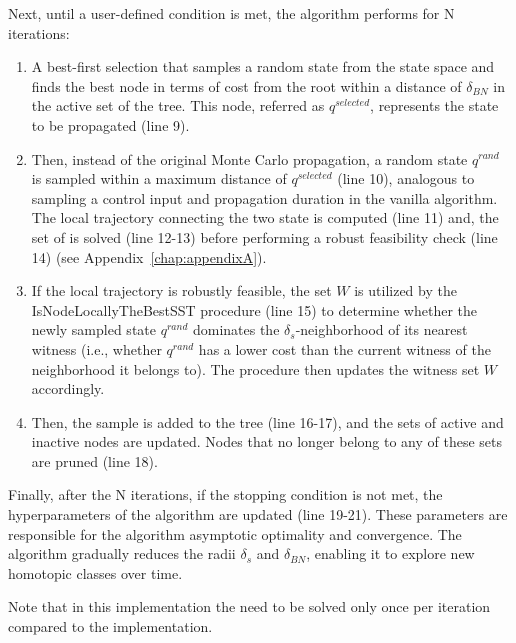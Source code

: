 Next, until a user-defined condition is met, the algorithm performs for N iterations:
\begin{enumerate}
    \item A best-first selection that samples a random state from the state space and finds the best node in terms of cost from the root within a distance of $\delta_{BN}$ in the active set of the tree. 
    This node, referred as $q^{selected}$, represents the state to be propagated (line 9).
    \item Then, instead of the original Monte Carlo propagation, a random state $q^{rand}$ is sampled within a maximum distance of $q^{selected}$ (line 10), analogous to sampling a control input and propagation duration in the vanilla algorithm.
    The local trajectory connecting the two state is computed (line 11) and, the set of  is solved (line 12-13) before performing a robust feasibility check (line 14) (see Appendix~\ref{chap:appendixA}).
    \item If the local trajectory is robustly feasible, the set $W$ is utilized by the IsNodeLocallyTheBestSST procedure (line 15) to determine whether the newly sampled state $q^{rand}$ dominates the $\delta_s$-neighborhood of its nearest witness (i.e., whether $q^{rand}$ has a lower cost than the current witness of the neighborhood it belongs to). 
    The procedure then updates the witness set $W$ accordingly.
    \item Then, the sample is added to the tree (line 16-17), and the sets of active and inactive nodes are updated.
    Nodes that no longer belong to any of these sets are pruned (line 18).
\end{enumerate}

Finally, after the N iterations, if the stopping condition is not met, the hyperparameters of the algorithm are updated (line 19-21).
These parameters are responsible for the algorithm asymptotic optimality and convergence. 
The algorithm gradually reduces the radii $\delta_s$ and $\delta_{BN}$, enabling it to explore new homotopic classes over time.

Note that in this implementation the  need to be solved only once per iteration compared to the  implementation.

